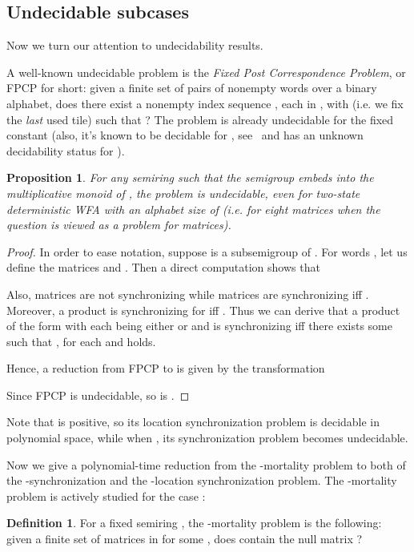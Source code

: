 \documentclass[submission,copyright,creativecommons]{eptcs}
\theoremstyle{plain}
\newtheorem{proposition}{Proposition}
\theoremstyle{definition}
\newtheorem{definition}{Definition}{}
\theoremstyle{remark}
\begin{document}
\subsection{Undecidable subcases}
Now we turn our attention to undecidability results.

A well-known undecidable problem is the \emph{Fixed Post Correspondence Problem}, or FPCP for short: given a finite set
 of pairs of nonempty words over a binary alphabet,
does there exist a nonempty index sequence , each  in ,  with  (i.e. we fix the
\emph{last} used tile) such that
? The problem is already undecidable for the fixed
constant  (also, it's known to be decidable for , see~\cite{halava} and has an unknown decidability status
for ).

\begin{proposition}
For any semiring  such that the semigroup  embeds into the multiplicative monoid  of ,
the  problem is undecidable, even for two-state deterministic WFA with an alphabet size of
 (i.e. for eight  matrices when the question is viewed as a problem for matrices).
\end{proposition}
\begin{proof}
In order to ease notation, suppose  is a subsemigroup of .
For words , let us define the matrices 
 and .
Then a direct computation shows that

Also, matrices  are not synchronizing while matrices  are synchronizing iff .
Moreover, a product  is synchronizing for  iff .
Thus we can derive that a product of the form   with each  being either  or 
and  is synchronizing iff there exists some  such that ,  for each  and
 holds.

Hence, a reduction from FPCP to  is given by the transformation

Since FPCP is undecidable, so is .
\end{proof}

Note that  is positive, so its location synchronization problem is decidable in polynomial space, while when , its synchronization problem becomes undecidable.

Now we give a polynomial-time reduction from the -mortality problem to both of the -synchronization and the -location synchronization problem. The -mortality problem is actively studied for the case :
\begin{definition}
For a fixed semiring , the -mortality problem is the following: given a finite set 
of matrices in  for some , does  contain the null matrix ?
\end{definition}
\end{document}
